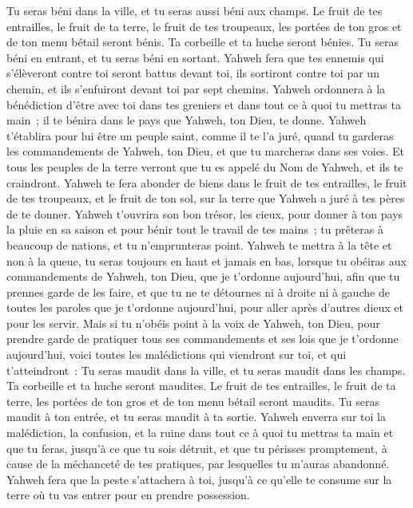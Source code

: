 \begin{multicols}{2}
Tu seras béni dans la ville, et tu seras aussi béni aux champs.
Le fruit de tes entrailles, le fruit de ta terre, le fruit de tes troupeaux, les portées de ton gros et de ton menu bétail seront bénis.
Ta corbeille et ta huche seront bénies.
Tu seras béni en entrant, et tu seras béni en sortant.
Yahweh fera que tes ennemis qui s'élèveront contre toi seront battus devant toi, ils sortiront contre toi par un chemin, et ils s'enfuiront devant toi par sept chemins.
Yahweh ordonnera à la bénédiction d'être avec toi dans tes greniers et dans tout ce à quoi tu mettras ta main~; il te bénira dans le pays que Yahweh, ton Dieu, te donne.
Yahweh t'établira pour lui être un peuple saint, comme il te l'a juré, quand tu garderas les commandements de Yahweh, ton Dieu, et que tu marcheras dans ses voies.
Et tous les peuples de la terre verront que tu es appelé du Nom de Yahweh, et ils te craindront.
Yahweh te fera abonder de biens dans le fruit de tes entrailles, le fruit de tes troupeaux, et le fruit de ton sol, sur la terre que Yahweh a juré à tes pères de te donner.
Yahweh t'ouvrira son bon trésor, les cieux, pour donner à ton pays la pluie en sa saison et pour bénir tout le travail de tes mains~; tu prêteras à beaucoup de nations, et tu n'emprunteras point.
Yahweh te mettra à la tête et non à la queue, tu seras toujours en haut et jamais en bas, lorsque tu obéiras aux commandements de Yahweh, ton Dieu, que je t'ordonne aujourd'hui, afin que tu prennes garde de les faire,
et que tu ne te détournes ni à droite ni à gauche de toutes les paroles que je t'ordonne aujourd'hui, pour aller après d'autres dieux et pour les servir.
Mais si tu n'obéis point à la voix de Yahweh, ton Dieu, pour prendre garde de pratiquer tous ses commandements et ses lois que je t'ordonne aujourd'hui, voici toutes les malédictions qui viendront sur toi, et qui t'atteindront~:
Tu seras maudit dans la ville, et tu seras maudit dans les champs.
Ta corbeille et ta huche seront maudites.
Le fruit de tes entrailles, le fruit de ta terre, les portées de ton gros et de ton menu bétail seront maudits.
Tu seras maudit à ton entrée, et tu seras maudit à ta sortie.
Yahweh enverra sur toi la malédiction, la confusion, et la ruine dans tout ce à quoi tu mettras ta main et que tu feras, jusqu'à ce que tu sois détruit, et que tu périsses promptement, à cause de la méchanceté de tes pratiques, par lesquelles tu m'auras abandonné.
Yahweh fera que la peste s'attachera à toi, jusqu'à ce qu'elle te consume sur la terre où tu vas entrer pour en prendre possession.

\end{multicols}
